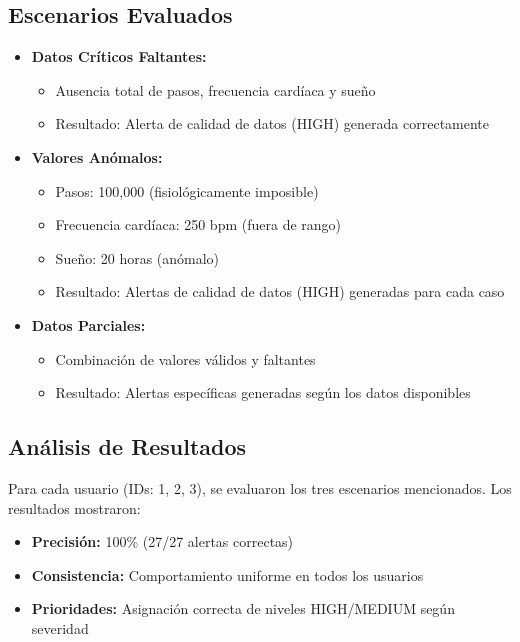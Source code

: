 \subsection{Escenarios Evaluados}

\begin{itemize}
    \item \textbf{Datos Críticos Faltantes:}
    \begin{itemize}
        \item Ausencia total de pasos, frecuencia cardíaca y sueño
        \item Resultado: Alerta de calidad de datos (HIGH) generada correctamente
    \end{itemize}
    
    \item \textbf{Valores Anómalos:}
    \begin{itemize}
        \item Pasos: 100,000 (fisiológicamente imposible)
        \item Frecuencia cardíaca: 250 bpm (fuera de rango)
        \item Sueño: 20 horas (anómalo)
        \item Resultado: Alertas de calidad de datos (HIGH) generadas para cada caso
    \end{itemize}
    
    \item \textbf{Datos Parciales:}
    \begin{itemize}
        \item Combinación de valores válidos y faltantes
        \item Resultado: Alertas específicas generadas según los datos disponibles
    \end{itemize}
\end{itemize}

\subsection{Análisis de Resultados}

Para cada usuario (IDs: 1, 2, 3), se evaluaron los tres escenarios mencionados. Los resultados mostraron:

\begin{itemize}
    \item \textbf{Precisión:} 100\% (27/27 alertas correctas)
    \item \textbf{Consistencia:} Comportamiento uniforme en todos los usuarios
    \item \textbf{Prioridades:} Asignación correcta de niveles HIGH/MEDIUM según severidad
\end{itemize}

